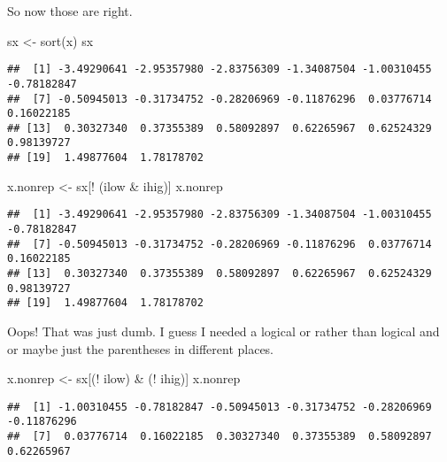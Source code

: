 \documentclass[
]{article}
\newenvironment{Shaded}{\begin{snugshade}}{\end{snugshade}}
\newcommand{\FunctionTok}[1]{\textcolor[rgb]{0.00,0.00,0.00}{#1}}
\newcommand{\NormalTok}[1]{#1}
\newcommand{\OtherTok}[1]{\textcolor[rgb]{0.56,0.35,0.01}{#1}}
\newcommand{\SpecialCharTok}[1]{\textcolor[rgb]{0.00,0.00,0.00}{#1}}
\begin{document}
So now those are right.

\begin{Shaded}
\begin{Highlighting}[]
\NormalTok{sx }\OtherTok{\textless{}{-}} \FunctionTok{sort}\NormalTok{(x)}
\NormalTok{sx}
\end{Highlighting}
\end{Shaded}

\begin{verbatim}
##  [1] -3.49290641 -2.95357980 -2.83756309 -1.34087504 -1.00310455 -0.78182847
##  [7] -0.50945013 -0.31734752 -0.28206969 -0.11876296  0.03776714  0.16022185
## [13]  0.30327340  0.37355389  0.58092897  0.62265967  0.62524329  0.98139727
## [19]  1.49877604  1.78178702
\end{verbatim}

\begin{Shaded}
\begin{Highlighting}[]
\NormalTok{x.nonrep }\OtherTok{\textless{}{-}}\NormalTok{ sx[}\SpecialCharTok{!}\NormalTok{ (ilow }\SpecialCharTok{\&}\NormalTok{ ihig)]}
\NormalTok{x.nonrep}
\end{Highlighting}
\end{Shaded}

\begin{verbatim}
##  [1] -3.49290641 -2.95357980 -2.83756309 -1.34087504 -1.00310455 -0.78182847
##  [7] -0.50945013 -0.31734752 -0.28206969 -0.11876296  0.03776714  0.16022185
## [13]  0.30327340  0.37355389  0.58092897  0.62265967  0.62524329  0.98139727
## [19]  1.49877604  1.78178702
\end{verbatim}

Oops! That was just dumb. I guess I needed a logical or rather than
logical and or maybe just the parentheses in different places.

\begin{Shaded}
\begin{Highlighting}[]
\NormalTok{x.nonrep }\OtherTok{\textless{}{-}}\NormalTok{ sx[(}\SpecialCharTok{!}\NormalTok{ ilow) }\SpecialCharTok{\&}\NormalTok{ (}\SpecialCharTok{!}\NormalTok{ ihig)]}
\NormalTok{x.nonrep}
\end{Highlighting}
\end{Shaded}

\begin{verbatim}
##  [1] -1.00310455 -0.78182847 -0.50945013 -0.31734752 -0.28206969 -0.11876296
##  [7]  0.03776714  0.16022185  0.30327340  0.37355389  0.58092897  0.62265967
\end{verbatim}
\end{document}

